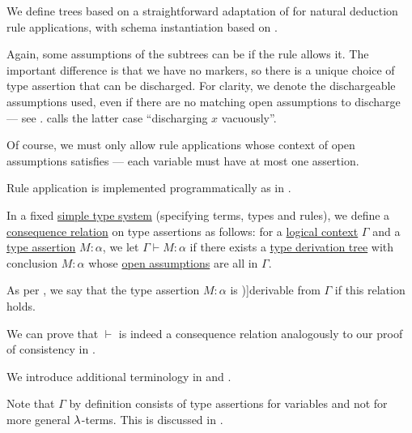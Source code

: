 \begin{definition}
\begin{thmenum}[resume=def:type_derivation_tree]
     We define  trees based on a straightforward adaptation of  for natural deduction rule applications, with schema instantiation based on .

    Again, some assumptions of the subtrees can be  if the rule allows it. The important difference is that we have no markers, so there is a unique choice of type assertion that can be discharged. For clarity, we denote the dischargeable assumptions used, even if there are no matching open assumptions to discharge --- see .  calls the latter case \enquote{discharging \( x \) vacuously}.

    Of course, we must only allow rule applications whose context of open assumptions satisfies  --- each variable must have at most one assertion.
  \end{thmenum}
\end{definition}
\begin{comments}
  \item Rule application is implemented programmatically as  in \cite{notebook:code}.
\end{comments}

\begin{definition}\label{def:simple_type_derivability}\mimprovised
  In a fixed \hyperref[def:simple_type_system]{simple type system} (specifying terms, types and rules), we define a \hyperref[def:consequence_relation]{consequence relation} on type assertions as follows: for a \hyperref[def:logical_context]{logical context} \( \Gamma \) and a \hyperref[def:type_assertion]{type assertion} \( M: \alpha \), we let \( \Gamma \vdash M: \alpha \) if there exists a \hyperref[def:type_derivation_tree]{type derivation tree} with conclusion \( M: \alpha \) whose \hyperref[def:natural_deduction_proof_tree/context]{open assumptions} are all in \( \Gamma \).

  As per , we say that the type assertion \( M: \alpha \) is \term[en=derivable (\cite[def. 3.1.4]{Barendregt1992Types})]{derivable} from \( \Gamma \) if this relation holds.
\end{definition}
\begin{defproof}
  We can prove that \( {\vdash} \) is indeed a consequence relation analogously to our proof of consistency in .
\end{defproof}
\begin{comments}
  \item We introduce additional terminology in  and .

  \item Note that \( \Gamma \) by definition consists of type assertions for variables and not for more general \( \mathrm{\lambda} \)-terms. This is discussed in .
\end{comments}

